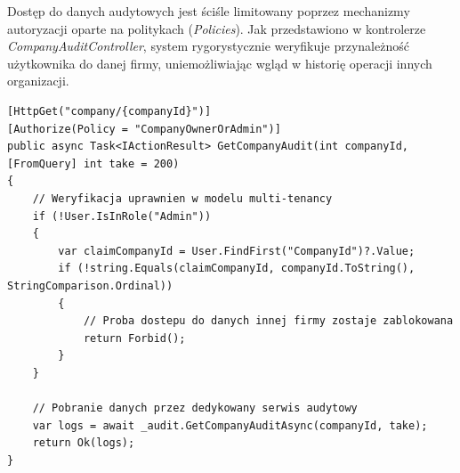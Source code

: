 Dostęp do danych audytowych jest ściśle limitowany poprzez mechanizmy autoryzacji oparte na politykach (\textit{Policies}). Jak przedstawiono w kontrolerze \textit{CompanyAuditController}, system rygorystycznie weryfikuje przynależność użytkownika do danej firmy, uniemożliwiając wgląd w historię operacji innych organizacji.

\begin{lstlisting}[language={[Sharp]C}, caption={Implementacja bezpiecznego dostępu do logów audytowych (CompanyAuditController.cs)}]
[HttpGet("company/{companyId}")]
[Authorize(Policy = "CompanyOwnerOrAdmin")]
public async Task<IActionResult> GetCompanyAudit(int companyId, [FromQuery] int take = 200)
{
    // Weryfikacja uprawnien w modelu multi-tenancy
    if (!User.IsInRole("Admin"))
    {
        var claimCompanyId = User.FindFirst("CompanyId")?.Value;
        if (!string.Equals(claimCompanyId, companyId.ToString(), StringComparison.Ordinal))
        {
            // Proba dostepu do danych innej firmy zostaje zablokowana
            return Forbid();
        }
    }

    // Pobranie danych przez dedykowany serwis audytowy
    var logs = await _audit.GetCompanyAuditAsync(companyId, take);
    return Ok(logs);
}
\end{lstlisting}